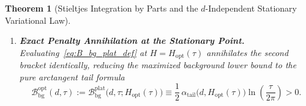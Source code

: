 \documentclass[11pt,reqno]{amsart}
\newtheorem{theorem}{Theorem}[section]
\theoremstyle{definition}
\theoremstyle{remark}
\numberwithin{equation}{section}
\begin{document}
\begin{theorem}[Stieltjes Integration by Parts and the $d$-Independent Stationary Variational Law]
\begin{enumerate}[label=\textup{(\roman*)},leftmargin=2.2em]
\begin{equation}
\end{equation}
Consequently, the $H$-derivative of $\mathcal{B}_{\mathrm{bg}}^{\mathrm{plat}}(d,\tau;H)$ factors as
\begin{equation}\label{eq:dB_bg_dH_factored}
\frac{\partial\mathcal{B}_{\mathrm{bg}}^{\mathrm{plat}}}{\partial H}(d,\tau;H) \equiv 2\,\frac{\partial K_{\min}}{\partial H}(d,H)\left[\frac{H}{2\pi}\ln\!\left(\frac{\tau}{2\pi}\right) - B_S(\tau)\right].
\end{equation}
Since $\partial_H K_{\min}(d,H) < 0$ for all $d > \frac{1}{2}$ and $H > 0$, $\mathcal{B}_{\mathrm{bg}}^{\mathrm{plat}}(d,\tau;H)$ attains its unique global maximum in $H \in (0, \infty)$ at the $d$-independent stationary window
\begin{equation}\label{eq:H_opt_def}
H_{\mathrm{opt}}(\tau) \equiv \frac{2\pi\,B_S(\tau)}{\ln(\tau/2\pi)}, \qquad \lim_{\tau \to \infty} H_{\mathrm{opt}}(\tau) = H_\infty := 2\pi A_S = 0.70371675440411368541\dots.
\end{equation}
\item \textbf{Exact Penalty Annihilation at the Stationary Point.} Evaluating~\eqref{eq:B_bg_plat_def} at $H = H_{\mathrm{opt}}(\tau)$ annihilates the second bracket identically, reducing the maximized background lower bound to the pure arctangent tail formula
\begin{equation}\label{eq:B_bg_opt_pure}
\mathcal{B}_{\mathrm{bg}}^{\mathrm{opt}}(d,\tau) := \mathcal{B}_{\mathrm{bg}}^{\mathrm{plat}}\bigl(d, \tau; H_{\mathrm{opt}}(\tau)\bigr) \equiv \frac{1}{2}\,\alpha_{\mathrm{tail}}\bigl(d, H_{\mathrm{opt}}(\tau)\bigr)\ln\!\left(\frac{\tau}{2\pi}\right) > 0.
\end{equation}
\end{enumerate}
\end{theorem}
\end{document}

